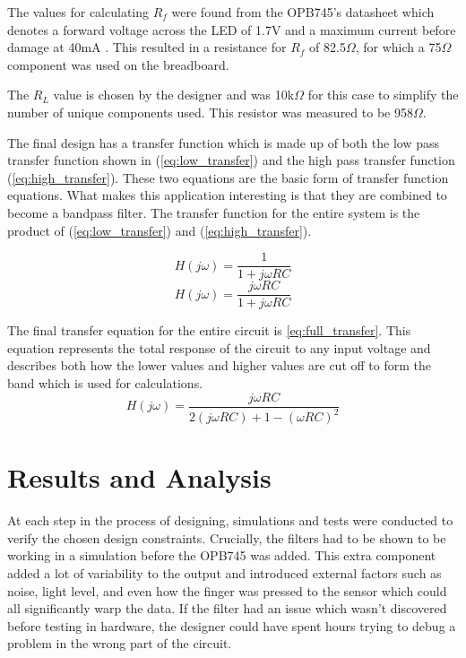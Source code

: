 \documentclass[conference]{IEEEtran}
\begin{document}

    The values for calculating $R_f$ were found from the OPB745's datasheet
    which denotes a forward voltage across the LED of 1.7V and a maximum
    current before damage at 40mA \cite{b2}. This resulted in a resistance for
    $R_f$ of 82.5$\Omega$, for which a 75$\Omega$ component was used on the
    breadboard.

    The $R_L$ value is chosen by the designer and was 10k$\Omega$ for this
    case to simplify the number of unique components used. This resistor was
    measured to be 958$\Omega$.
    
    The final design has a transfer function which is made up of both the low
    pass transfer function shown in (\ref{eq:low_transfer}) and the high pass
    transfer function (\ref{eq:high_transfer}). These two equations are the basic
    form of transfer function equations. What makes this application
    interesting is that they are combined to become a bandpass filter.
    The transfer function for the entire system is the product of
    (\ref{eq:low_transfer}) and (\ref{eq:high_transfer}).

    \begin{equation}
        H(j\omega) = \frac{1}{1+j\omega RC}
        \label{eq:low_transfer}
    \end{equation}
    \begin{equation}
        H(j\omega) = \frac{j\omega RC}{1+j\omega RC}
        \label{eq:high_transfer}
    \end{equation}

    The final transfer equation for the entire circuit is
    \ref{eq:full_transfer}. This equation represents the total response of the
    circuit to any input voltage and describes both how the lower values and
    higher values are cut off to form the band which is used for calculations.
    \begin{equation}
        H(j\omega) = \frac{j\omega RC}{2(j\omega RC) + 1 - (\omega RC)^2}
        \label{eq:full_transfer}
    \end{equation}

\section{Results and Analysis}
    At each step in the process of designing, simulations and tests were
    conducted to verify the chosen design constraints. Crucially, the filters
    had to be shown to be working in a simulation before the OPB745 was added.
    This extra component added a lot of variability to the output and
    introduced external factors such as noise, light level, and even how the
    finger was pressed to the sensor which could all significantly warp the
    data. If the filter had an issue which wasn't discovered before testing
    in hardware, the designer could have spent hours trying to debug a problem
    in the wrong part of the circuit.
\end{document}
